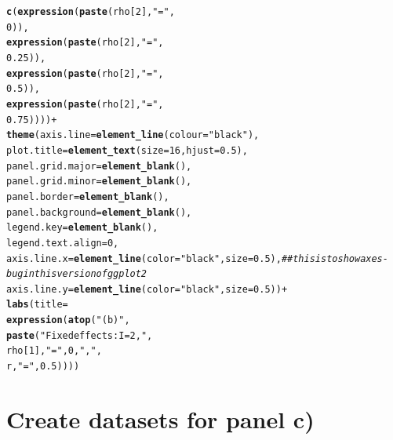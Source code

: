 \documentclass{article}\usepackage[]{graphicx}\usepackage[]{color}
\makeatletter
\newcommand{\hlnum}[1]{\textcolor[rgb]{0.686,0.059,0.569}{#1}}%
\newcommand{\hlstr}[1]{\textcolor[rgb]{0.192,0.494,0.8}{#1}}%
\newcommand{\hlcom}[1]{\textcolor[rgb]{0.678,0.584,0.686}{\textit{#1}}}%
\newcommand{\hlopt}[1]{\textcolor[rgb]{0,0,0}{#1}}%
\newcommand{\hlstd}[1]{\textcolor[rgb]{0.345,0.345,0.345}{#1}}%
\newcommand{\hlkwc}[1]{\textcolor[rgb]{0.333,0.667,0.333}{#1}}%
\newcommand{\hlkwd}[1]{\textcolor[rgb]{0.737,0.353,0.396}{\textbf{#1}}}%
\newenvironment{kframe}{%
 \def\at@end@of@kframe{}%
 \ifinner\ifhmode%
  \def\at@end@of@kframe{\end{minipage}}%
  \begin{minipage}{\columnwidth}%
 \fi\fi%
 \def\FrameCommand##1{\hskip\@totalleftmargin \hskip-\fboxsep
 \colorbox{shadecolor}{##1}\hskip-\fboxsep
     \hskip-\linewidth \hskip-\@totalleftmargin \hskip\columnwidth}%
 \MakeFramed {\advance\hsize-\width
   \@totalleftmargin\z@ \linewidth\hsize
   \@setminipage}}%
 {\par\unskip\endMakeFramed%
 \at@end@of@kframe}
\newenvironment{knitrout}{}{} %
\makeatother
\begin{document}
\begin{knitrout}
\begin{kframe}
\begin{alltt}
                         \hlkwd{c}\hlstd{(}\hlkwd{expression}\hlstd{(}\hlkwd{paste}\hlstd{(rho[}\hlnum{2}\hlstd{],} \hlstr{"="}\hlstd{,}
                                            \hlnum{0}\hlstd{)),}
                           \hlkwd{expression}\hlstd{(}\hlkwd{paste}\hlstd{(rho[}\hlnum{2}\hlstd{],} \hlstr{"="}\hlstd{,}
                                            \hlnum{0.25}\hlstd{)),}
                           \hlkwd{expression}\hlstd{(}\hlkwd{paste}\hlstd{(rho[}\hlnum{2}\hlstd{],} \hlstr{"="}\hlstd{,}
                                            \hlnum{0.5}\hlstd{)),}
                           \hlkwd{expression}\hlstd{(}\hlkwd{paste}\hlstd{(rho[}\hlnum{2}\hlstd{],} \hlstr{"="}\hlstd{,}
                                            \hlnum{0.75}\hlstd{))))} \hlopt{+}
  \hlkwd{theme}\hlstd{(}\hlkwc{axis.line} \hlstd{=} \hlkwd{element_line}\hlstd{(}\hlkwc{colour} \hlstd{=} \hlstr{"black"}\hlstd{),}
        \hlkwc{plot.title} \hlstd{=} \hlkwd{element_text}\hlstd{(}\hlkwc{size} \hlstd{=} \hlnum{16}\hlstd{,} \hlkwc{hjust} \hlstd{=} \hlnum{0.5}\hlstd{),}
        \hlkwc{panel.grid.major} \hlstd{=} \hlkwd{element_blank}\hlstd{(),}
        \hlkwc{panel.grid.minor} \hlstd{=} \hlkwd{element_blank}\hlstd{(),}
        \hlkwc{panel.border} \hlstd{=} \hlkwd{element_blank}\hlstd{(),}
        \hlkwc{panel.background} \hlstd{=} \hlkwd{element_blank}\hlstd{(),}
        \hlkwc{legend.key} \hlstd{=} \hlkwd{element_blank}\hlstd{(),}
        \hlkwc{legend.text.align} \hlstd{=} \hlnum{0}\hlstd{,}
        \hlkwc{axis.line.x} \hlstd{=} \hlkwd{element_line}\hlstd{(}\hlkwc{color}\hlstd{=}\hlstr{"black"}\hlstd{,} \hlkwc{size} \hlstd{=} \hlnum{0.5}\hlstd{),} \hlcom{##this is to show axes - bug in this version of ggplot2}
        \hlkwc{axis.line.y} \hlstd{=} \hlkwd{element_line}\hlstd{(}\hlkwc{color}\hlstd{=}\hlstr{"black"}\hlstd{,} \hlkwc{size} \hlstd{=} \hlnum{0.5}\hlstd{))} \hlopt{+}
  \hlkwd{labs}\hlstd{(}\hlkwc{title}\hlstd{=}
         \hlkwd{expression}\hlstd{(}\hlkwd{atop}\hlstd{(}\hlstr{"(b)"}\hlstd{,}
                         \hlkwd{paste}\hlstd{(}\hlstr{"Fixed effects: I = 2, "}\hlstd{,}
                               \hlstd{rho[}\hlnum{1}\hlstd{],} \hlstr{" = "}\hlstd{,} \hlnum{0}\hlstd{,} \hlstr{", "}\hlstd{,}
                               \hlstd{r,} \hlstr{" = "}\hlstd{,} \hlnum{0.5}\hlstd{))))}
\end{alltt}
\end{kframe}
\end{knitrout}

\section{Create datasets for panel c)}
\end{document}
